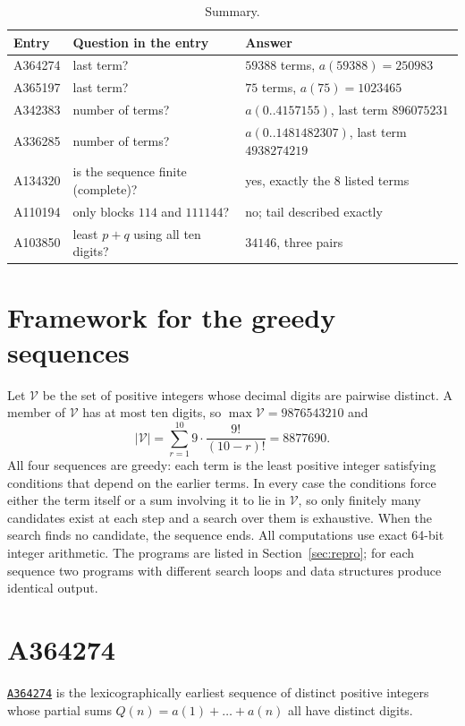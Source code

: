 \documentclass[11pt,a4paper]{article}
\theoremstyle{remark}
\newcommand{\oeis}[1]{\href{https://oeis.org/#1}{\texttt{#1}}}
\begin{document}
\begin{table}[h]
\centering
\begin{tabular}{lll}
\toprule
Entry & Question in the entry & Answer \\
\midrule
A364274 & last term? & $59388$ terms, $a(59388)=250983$ \\
A365197 & last term? & $75$ terms, $a(75)=1023465$ \\
A342383 & number of terms? & $a(0..4157155)$, last term $896075231$ \\
A336285 & number of terms? & $a(0..1481482307)$, last term $4938274219$ \\
A134320 & is the sequence finite (complete)? & yes, exactly the 8 listed terms \\
A110194 & only blocks $114$ and $111144$? & no; tail described exactly \\
A103850 & least $p+q$ using all ten digits? & $34146$, three pairs \\
\bottomrule
\end{tabular}
\caption{Summary.}\label{tab:summary}
\end{table}

\section{Framework for the greedy sequences}\label{sec:frame}

Let $\mathcal V$ be the set of positive integers whose decimal digits are pairwise distinct. A member of $\mathcal V$ has at most ten digits, so $\max\mathcal V=9876543210$ and
\[
 |\mathcal V|=\sum_{r=1}^{10}9\cdot\frac{9!}{(10-r)!}=8877690 .
\]
All four sequences are greedy: each term is the least positive integer satisfying conditions that depend on the earlier terms. In every case the conditions force either the term itself or a sum involving it to lie in $\mathcal V$, so only finitely many candidates exist at each step and a search over them is exhaustive. When the search finds no candidate, the sequence ends. All computations use exact 64-bit integer arithmetic. The programs are listed in Section~\ref{sec:repro}; for each sequence two programs with different search loops and data structures produce identical output.

\section{A364274}\label{sec:364274}

\oeis{A364274} is the lexicographically earliest sequence of distinct positive integers whose partial sums $Q(n)=a(1)+\dots+a(n)$ all have distinct digits.
\end{document}

